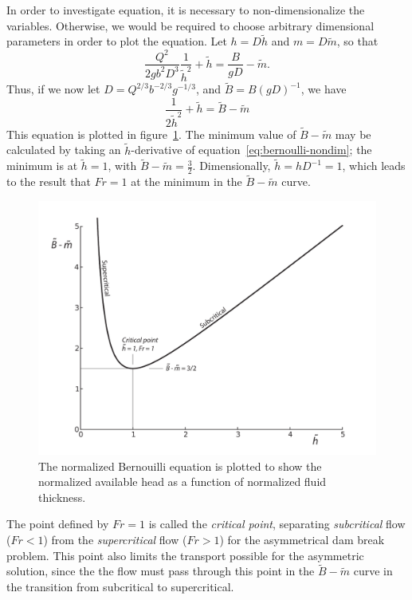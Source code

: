 \documentclass[11pt]{report}
\numberwithin{equation}{section}
\begin{document}
In order to investigate equation, it is necessary to non-dimensionalize the variables.  Otherwise, we would be required to choose arbitrary dimensional parameters in order to plot the equation.  Let $h=D\tilde{h}$ and $m=D\tilde{m}$, so that
\begin{equation}
    \frac{Q^2}{2 g b^2 D^3}\frac{1}{\tilde{h}^2} + \tilde{h} = \frac{B}{g D} - \tilde{m}.
\end{equation}
Thus, if we now let $D = Q^{2/3} b^{-2/3} g^{-1/3}$, and $\tilde{B} = B (g D)^{-1}$, we have
\begin{equation}
    \frac{1}{2 \tilde{h}^2} + \tilde{h} = \tilde{B} - \tilde{m}
    \label{eq:bernoulli-nondim}
\end{equation}
This equation is plotted in figure~\ref{fig:hydraulic_B-m}.  The minimum value of $\tilde{B} - \tilde{m}$ may be calculated by taking an $\tilde{h}$-derivative of equation~\ref{eq:bernoulli-nondim}; the minimum is at $\tilde{h}=1$, with $\tilde{B} - \tilde{m} = \frac{3}{2}$.  Dimensionally, $\tilde{h} = h D^{-1} = 1$, which leads to the result that $Fr=1$ at the minimum in the $\tilde{B} - \tilde{m}$ curve.


\begin{figure}[tb]
    \centering
    \includegraphics[width=5in]{hydraulic_B-m} 
    \caption{The normalized Bernouilli equation is plotted to show the normalized available head as a function of normalized fluid thickness.}
    \label{fig:hydraulic_B-m}
\end{figure}

The point defined by $Fr=1$ is called the {\it critical point}, separating \emph{subcritical} flow ($Fr < 1$) from the \emph{supercritical} flow ($Fr>1$) for the asymmetrical dam break problem.  This point also limits the transport possible for the asymmetric solution, since the the flow must pass through this point in the $\tilde{B}-\tilde{m}$ curve in the transition from subcritical to supercritical.  
\end{document}
